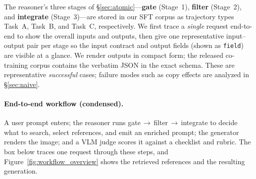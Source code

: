 
The reasoner's three stages of \S\ref{sec:atomic}---\textbf{gate} (Stage~1),
\textbf{filter} (Stage~2), and \textbf{integrate} (Stage~3)---are stored in our SFT
corpus as trajectory types Task~A, Task~B, and Task~C, respectively.
We first trace a \emph{single} request end-to-end to show the overall inputs and outputs,
then give one representative input--output pair per stage so the input contract and output
fields (shown as \texttt{field}) are visible at a glance. We render outputs in compact
form; the released co-training corpus contains the verbatim JSON in the exact schema.
These are representative \emph{successful} cases; failure modes such as copy effects are
analyzed in \S\ref{sec:naive}.

\paragraph{End-to-end workflow (condensed).}
A user prompt enters; the reasoner runs gate\,$\to$\,filter\,$\to$\,integrate to decide
what to search, select references, and emit an enriched prompt; the generator renders the
image; and a VLM judge scores it against a checklist and rubric. The box below traces one
request through these steps, and Figure~\ref{fig:workflow_overview} shows the retrieved
references and the resulting generation.

